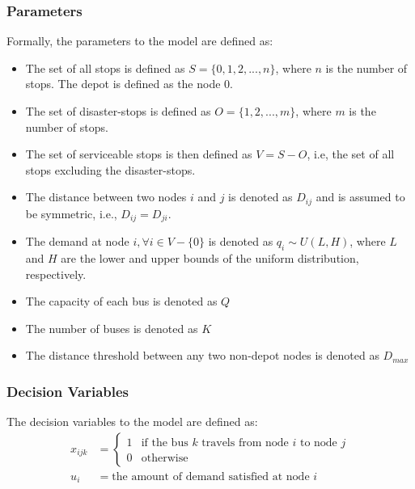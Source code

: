 \documentclass[12pt]{article}
\begin{document}
\subsubsection{Parameters}\label{sec:parameters}
Formally, the parameters to the model are defined as:
\begin{itemize}
    \item The set of all stops is defined as $S = \{0, 1, 2, ..., n\}$, where $n$ is the number of stops. The depot is defined as the node ${0}$.
    \item The set of disaster-stops is defined as $O = \{1, 2, ..., m\}$, where $m$ is the number of stops.
    \item The set of serviceable stops is then defined as $V = S - O$, i.e, the set of all stops excluding the disaster-stops.
    \item The distance between two nodes $i$ and $j$ is denoted as $D_{ij}$ and is assumed to be symmetric, i.e., $D_{ij} = D_{ji}$.
    \item The demand at node $i, \forall i \in V - \{0\}$ is denoted as $q_i \sim U(L, H)$,
          where $L$ and $H$ are the lower and upper bounds of the uniform distribution, respectively.
    \item The capacity of each bus is denoted as $Q$
    \item The number of buses is denoted as $K$
    \item The distance threshold between any two non-depot nodes is denoted as $D_{max}$

\end{itemize}

\subsubsection{Decision Variables}
The decision variables to the model are defined as:
\begin{align*}
    x_{ijk} & = \begin{cases}
                    1 & \text{if the bus $k$ travels from node $i$ to node $j$} \\
                    0 & \text{otherwise}
                \end{cases} \\
    u_i     & = \text{the amount of demand satisfied at node $i$}
\end{align*}
\end{document}
